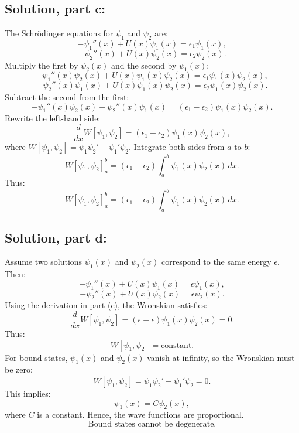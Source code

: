 \documentclass[12pt]{article}
\begin{document}
    \subsection*{Solution, part c:}
        The Schrödinger equations for \(\psi_1\) and \(\psi_2\) are:
        \[
        -\psi_1''(x) + U(x)\psi_1(x) = \epsilon_1 \psi_1(x),
        \]
        \[
        -\psi_2''(x) + U(x)\psi_2(x) = \epsilon_2 \psi_2(x).
        \]
        Multiply the first by \(\psi_2(x)\) and the second by \(\psi_1(x)\):
        \[
        -\psi_1''(x)\psi_2(x) + U(x)\psi_1(x)\psi_2(x) = \epsilon_1 \psi_1(x)\psi_2(x),
        \]
        \[
        -\psi_2''(x)\psi_1(x) + U(x)\psi_1(x)\psi_2(x) = \epsilon_2 \psi_1(x)\psi_2(x).
        \]
        Subtract the second from the first:
        \[
        -\psi_1''(x)\psi_2(x) + \psi_2''(x)\psi_1(x) = (\epsilon_1 - \epsilon_2)\psi_1(x)\psi_2(x).
        \]
        Rewrite the left-hand side:
        \[
        \frac{d}{dx} W[\psi_1, \psi_2] = (\epsilon_1 - \epsilon_2)\psi_1(x)\psi_2(x),
        \]
        where \(W[\psi_1, \psi_2] = \psi_1 \psi_2' - \psi_1' \psi_2\).
        Integrate both sides from \(a\) to \(b\):
        \[
        W[\psi_1, \psi_2]_a^b = (\epsilon_1 - \epsilon_2) \int_a^b \psi_1(x)\psi_2(x) \, dx.
        \]
        Thus:
        \[
        \boxed{W[\psi_1, \psi_2]_a^b = (\epsilon_1 - \epsilon_2) \int_a^b \psi_1(x)\psi_2(x) \, dx.}
        \]

    \subsection*{Solution, part d:}
        Assume two solutions \(\psi_1(x)\) and \(\psi_2(x)\) correspond to the same energy \(\epsilon\). Then:
        \[
        -\psi_1''(x) + U(x)\psi_1(x) = \epsilon \psi_1(x),
        \]
        \[
        -\psi_2''(x) + U(x)\psi_2(x) = \epsilon \psi_2(x).
        \]
        Using the derivation in part (c), the Wronskian satisfies:
        \[
        \frac{d}{dx} W[\psi_1, \psi_2] = (\epsilon - \epsilon) \psi_1(x)\psi_2(x) = 0.
        \]
        Thus:
        \[
        W[\psi_1, \psi_2] = \text{constant}.
        \]
        For bound states, \(\psi_1(x)\) and \(\psi_2(x)\) vanish at infinity, so the Wronskian must be zero:
        \[
        W[\psi_1, \psi_2] = \psi_1 \psi_2' - \psi_1' \psi_2 = 0.
        \]
        This implies:
        \[
        \psi_1(x) = C \psi_2(x),
        \]
        where \(C\) is a constant. Hence, the wave functions are proportional.
        \[
        \boxed{\text{Bound states cannot be degenerate.}}
        \]
\end{document}

